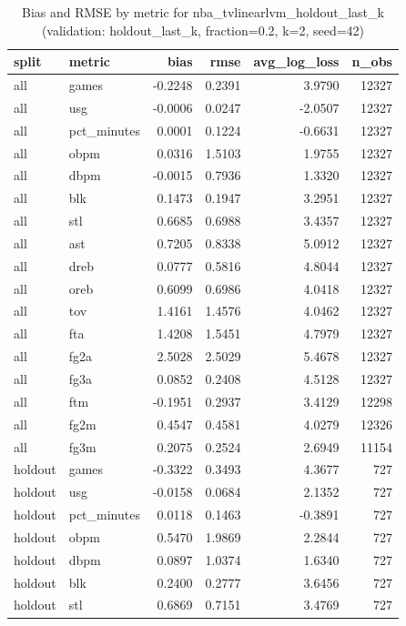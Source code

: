 \begin{table}
\caption{Bias and RMSE by metric for nba_tvlinearlvm_holdout_last_k (validation: holdout_last_k, fraction=0.2, k=2, seed=42)}
\label{tab:nba_tvlinearlvm_holdout_last_k_vs_holdout_last_k_f20_k2_s42_bias_rmse}
\begin{tabular}{llrrrr}
\toprule
split & metric & bias & rmse & avg\_log\_loss & n\_obs \\
\midrule
all & games & -0.2248 & 0.2391 & 3.9790 & 12327 \\
all & usg & -0.0006 & 0.0247 & -2.0507 & 12327 \\
all & pct\_minutes & 0.0001 & 0.1224 & -0.6631 & 12327 \\
all & obpm & 0.0316 & 1.5103 & 1.9755 & 12327 \\
all & dbpm & -0.0015 & 0.7936 & 1.3320 & 12327 \\
all & blk & 0.1473 & 0.1947 & 3.2951 & 12327 \\
all & stl & 0.6685 & 0.6988 & 3.4357 & 12327 \\
all & ast & 0.7205 & 0.8338 & 5.0912 & 12327 \\
all & dreb & 0.0777 & 0.5816 & 4.8044 & 12327 \\
all & oreb & 0.6099 & 0.6986 & 4.0418 & 12327 \\
all & tov & 1.4161 & 1.4576 & 4.0462 & 12327 \\
all & fta & 1.4208 & 1.5451 & 4.7979 & 12327 \\
all & fg2a & 2.5028 & 2.5029 & 5.4678 & 12327 \\
all & fg3a & 0.0852 & 0.2408 & 4.5128 & 12327 \\
all & ftm & -0.1951 & 0.2937 & 3.4129 & 12298 \\
all & fg2m & 0.4547 & 0.4581 & 4.0279 & 12326 \\
all & fg3m & 0.2075 & 0.2524 & 2.6949 & 11154 \\
holdout & games & -0.3322 & 0.3493 & 4.3677 & 727 \\
holdout & usg & -0.0158 & 0.0684 & 2.1352 & 727 \\
holdout & pct\_minutes & 0.0118 & 0.1463 & -0.3891 & 727 \\
holdout & obpm & 0.5470 & 1.9869 & 2.2844 & 727 \\
holdout & dbpm & 0.0897 & 1.0374 & 1.6340 & 727 \\
holdout & blk & 0.2400 & 0.2777 & 3.6456 & 727 \\
holdout & stl & 0.6869 & 0.7151 & 3.4769 & 727 \\

\end{tabular}
\end{table}
